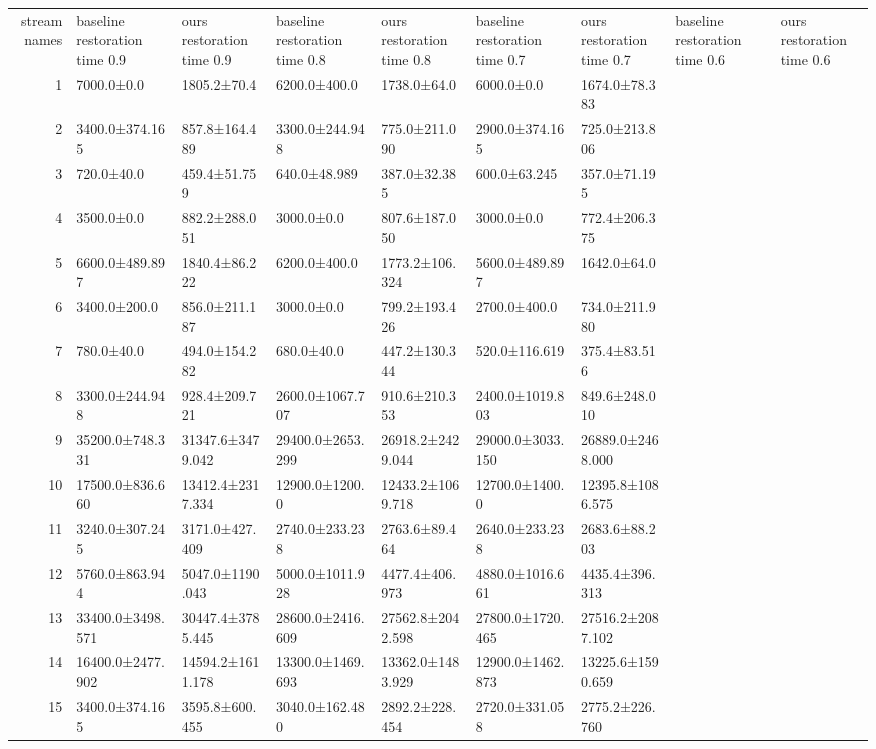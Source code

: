\begin{tabular}{|r|l|l|l|l|l|l|l|l|}
  \hline
  stream names & baseline restoration time 0.9 & ours restoration time 0.9 & baseline restoration time 0.8 & ours restoration time 0.8 & baseline restoration time 0.7 & ours restoration time 0.7 & baseline restoration time 0.6 & ours restoration time 0.6 \\ 
  1 & 7000.0±0.0 & 1805.2±70.4 & 6200.0±400.0 & 1738.0±64.0 & 6000.0±0.0 & 1674.0±78.383 \\ 
  2 & 3400.0±374.165 & 857.8±164.489 & 3300.0±244.948 & 775.0±211.090 & 2900.0±374.165 & 725.0±213.806 \\ 
  3 & 720.0±40.0 & 459.4±51.759 & 640.0±48.989 & 387.0±32.385 & 600.0±63.245 & 357.0±71.195 \\ 
  4 & 3500.0±0.0 & 882.2±288.051 & 3000.0±0.0 & 807.6±187.050 & 3000.0±0.0 & 772.4±206.375 \\ 
  5 & 6600.0±489.897 & 1840.4±86.222 & 6200.0±400.0 & 1773.2±106.324 & 5600.0±489.897 & 1642.0±64.0 \\ 
  6 & 3400.0±200.0 & 856.0±211.187 & 3000.0±0.0 & 799.2±193.426 & 2700.0±400.0 & 734.0±211.980 \\ 
  7 & 780.0±40.0 & 494.0±154.282 & 680.0±40.0 & 447.2±130.344 & 520.0±116.619 & 375.4±83.516 \\ 
  8 & 3300.0±244.948 & 928.4±209.721 & 2600.0±1067.707 & 910.6±210.353 & 2400.0±1019.803 & 849.6±248.010 \\ 
  9 & 35200.0±748.331 & 31347.6±3479.042 & 29400.0±2653.299 & 26918.2±2429.044 & 29000.0±3033.150 & 26889.0±2468.000 \\ 
  10 & 17500.0±836.660 & 13412.4±2317.334 & 12900.0±1200.0 & 12433.2±1069.718 & 12700.0±1400.0 & 12395.8±1086.575 \\ 
  11 & 3240.0±307.245 & 3171.0±427.409 & 2740.0±233.238 & 2763.6±89.464 & 2640.0±233.238 & 2683.6±88.203 \\ 
  12 & 5760.0±863.944 & 5047.0±1190.043 & 5000.0±1011.928 & 4477.4±406.973 & 4880.0±1016.661 & 4435.4±396.313 \\ 
  13 & 33400.0±3498.571 & 30447.4±3785.445 & 28600.0±2416.609 & 27562.8±2042.598 & 27800.0±1720.465 & 27516.2±2087.102 \\ 
  14 & 16400.0±2477.902 & 14594.2±1611.178 & 13300.0±1469.693 & 13362.0±1483.929 & 12900.0±1462.873 & 13225.6±1590.659 \\ 
  15 & 3400.0±374.165 & 3595.8±600.455 & 3040.0±162.480 & 2892.2±228.454 & 2720.0±331.058 & 2775.2±226.760 \\ 

\end{tabular}
